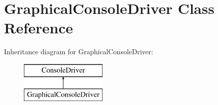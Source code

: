 \hypertarget{class_graphical_console_driver}{}\section{Graphical\+Console\+Driver Class Reference}
\label{class_graphical_console_driver}
Inheritance diagram for Graphical\+Console\+Driver\+:\begin{figure}[H]
\begin{center}
\leavevmode
\includegraphics[height=2.000000cm]{class_graphical_console_driver}
\end{center}
\end{figure}
